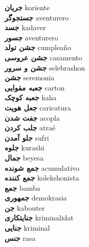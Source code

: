 \textbf{ جریان  } koriente \\
\textbf{ جستجوگر  } aventurero \\
\textbf{ جسد  } kadaver \\
\textbf{ جسور  } aventurero \\
\textbf{ جشن تولد  } cumpleaño \\
\textbf{ جشن عروسی  } casamento \\
\textbf{ جشن و سرور  } selebrashon \\
\textbf{ جشن  } seremonia \\
\textbf{ جعبه مقوایی  } carton \\
\textbf{ جعبه کوچک  } kaha \\
\textbf{ جعل هویت  } caricatura \\
\textbf{ جفت شدن  } acopla \\
\textbf{ جلب کردن  } atraé \\
\textbf{ جلو آمدن  } sufri \\
\textbf{ جلوه  } kurashi \\
\textbf{ جمال  } beyesa \\
\textbf{ جمع شونده  } acumulativo \\
\textbf{ جمع کننده  } kolekshonista \\
\textbf{ جمع  } bamba \\
\textbf{ جمهوری  } demokrasia \\
\textbf{ جن  } kabouter \\
\textbf{ جنایتکاری  } kriminalidat \\
\textbf{ جنایی  } kriminal \\
\textbf{ جنس  } rasa \\
